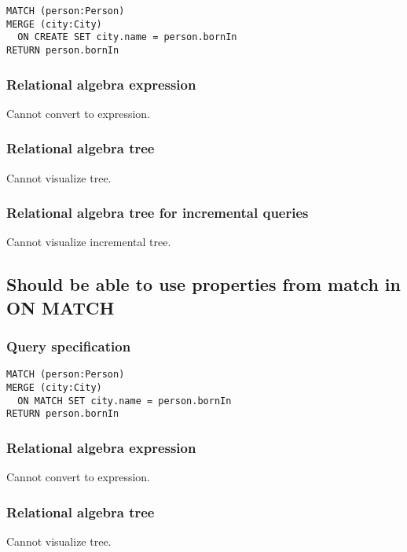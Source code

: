 \begin{lstlisting}
MATCH (person:Person)
MERGE (city:City)
  ON CREATE SET city.name = person.bornIn
RETURN person.bornIn
\end{lstlisting}

\subsubsection*{Relational algebra expression}

Cannot convert to expression.

\subsubsection*{Relational algebra tree}

Cannot visualize tree.

\subsubsection*{Relational algebra tree for incremental queries}

Cannot visualize incremental tree.

\subsection{Should be able to use properties from match in ON MATCH}

\subsubsection*{Query specification}

\begin{lstlisting}
MATCH (person:Person)
MERGE (city:City)
  ON MATCH SET city.name = person.bornIn
RETURN person.bornIn
\end{lstlisting}

\subsubsection*{Relational algebra expression}

Cannot convert to expression.

\subsubsection*{Relational algebra tree}

Cannot visualize tree.

